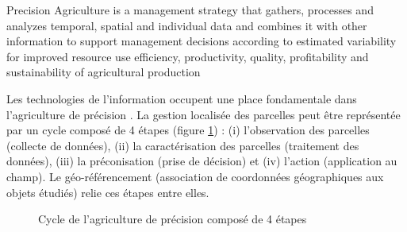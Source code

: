 \documentclass[../thesis.tex]{subfiles}
\begin{document}
    
    \par \og Precision Agriculture is a management strategy that gathers, processes and analyzes temporal, spatial and individual data and combines it with other information to support management decisions according to estimated variability for improved resource use efficiency, productivity, quality, profitability and sustainability of agricultural production \fg
    
    Les technologies de l'information occupent une place fondamentale dans l'agriculture de précision \cite{lherbier2005valorisation}. La gestion localisée des parcelles peut être représentée par un cycle composé de 4 étapes (figure \ref{fig:02-intro-agri-precision-context}) : (i) l'observation des parcelles (collecte de données), (ii) la caractérisation des parcelles (traitement des données), (iii) la préconisation (prise de décision) et (iv) l'action (application au champ). Le géo-référencement (association de coordonnées géographiques aux objets étudiés) relie ces étapes entre elles.
    
    \vfill
    \begin{figure}[H]
        \centering
        
        \caption{Cycle de l'agriculture de précision composé de 4 étapes}
        \label{fig:02-intro-agri-precision-context}
    \end{figure}
    \vfill
    
\end{document}
